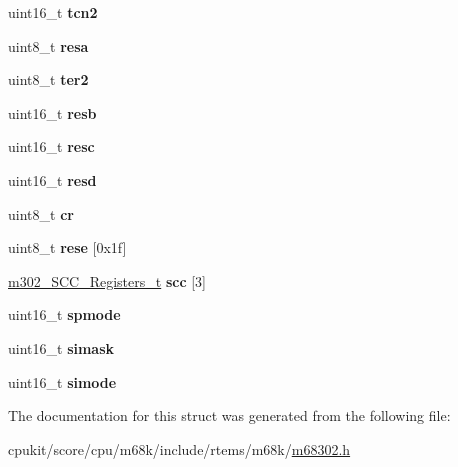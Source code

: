 \begin{DoxyCompactItemize}
uint16\+\_\+t {\bfseries tcn2}
\item 
\mbox{\label{structm302__internalReg__t_ad7294a31a77445d54173bb7a8925824d}} 
uint8\+\_\+t {\bfseries resa}
\item 
\mbox{\label{structm302__internalReg__t_af242bd8e38c9f66f813214bff0fce410}} 
uint8\+\_\+t {\bfseries ter2}
\item 
\mbox{\label{structm302__internalReg__t_a069d609138aac6d1a37b383db53ffdac}} 
uint16\+\_\+t {\bfseries resb}
\item 
\mbox{\label{structm302__internalReg__t_a093ea70c5e4a590614810dcfa0eeb0cc}} 
uint16\+\_\+t {\bfseries resc}
\item 
\mbox{\label{structm302__internalReg__t_a362c7b6094ccc02272341e67e8f36b74}} 
uint16\+\_\+t {\bfseries resd}
\item 
\mbox{\label{structm302__internalReg__t_ab7bf5a3221ce7ff70fca4513944032f3}} 
uint8\+\_\+t {\bfseries cr}
\item 
\mbox{\label{structm302__internalReg__t_a8012a2b82c9b713da72535b809cead76}} 
uint8\+\_\+t {\bfseries rese} \mbox{[}0x1f\mbox{]}
\item 
\mbox{\label{structm302__internalReg__t_ae105df24ffc3f885594b1cc4d6cca013}} 
\mbox{\hyperlink{structm302__SCC__Registers__t}{m302\+\_\+\+S\+C\+C\+\_\+\+Registers\+\_\+t}} {\bfseries scc} \mbox{[}3\mbox{]}
\item 
\mbox{\label{structm302__internalReg__t_afa55bb59401c62eae106377f767b7d59}} 
uint16\+\_\+t {\bfseries spmode}
\item 
\mbox{\label{structm302__internalReg__t_a0a2b496753d630eec9354758f4731473}} 
uint16\+\_\+t {\bfseries simask}
\item 
\mbox{\label{structm302__internalReg__t_a95f1db5de9adca0e33fb70417063c00b}} 
uint16\+\_\+t {\bfseries simode}
\end{DoxyCompactItemize}


The documentation for this struct was generated from the following file\+:\begin{DoxyCompactItemize}
\item 
cpukit/score/cpu/m68k/include/rtems/m68k/\mbox{\hyperlink{m68302_8h}{m68302.\+h}}\end{DoxyCompactItemize}
